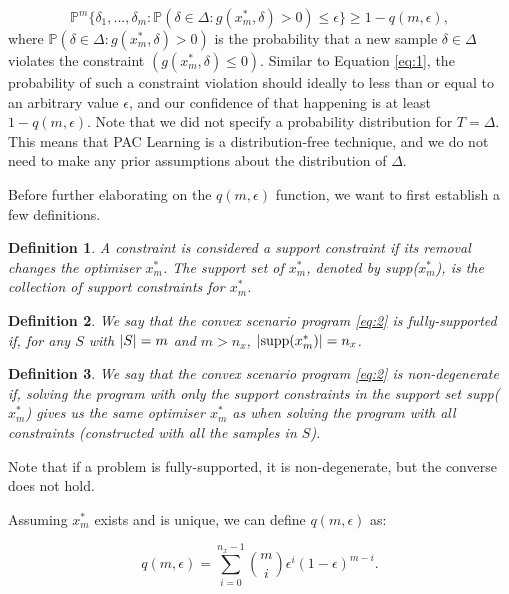 \documentclass[11pt]{article}
\newtheorem{theorem}{Definition}
\begin{document}
\begin{equation}
	\label{eq:3}
	\mathbb{P}^{m} \{\delta_{1},...,\delta_{m}: \mathbb{P}(\delta \in \Delta: g(x^{*}_{m},\delta) > 0) \leq \epsilon \} \geq 1 - q(m,\epsilon),
\end{equation}
where $\mathbb{P}(\delta \in \Delta: g(x^{*}_{m},\delta) > 0)$ is the probability that a new sample $\delta\in \Delta$ violates the constraint $(g(x^{*}_{m},\delta) \leq 0)$. Similar to Equation \ref{eq:1}, the probability of such a constraint violation should ideally to less than or equal to an arbitrary value $\epsilon$, and our confidence of that happening is at least $1 - q(m,\epsilon)$. Note that we did not specify a probability distribution for $T=\Delta$. This means that PAC Learning is a distribution-free technique, and we do not need to make any prior assumptions about the distribution of $\Delta$.

Before further elaborating on the $q(m,\epsilon)$ function, we want to first establish a few definitions.


\begin{theorem}
	A constraint is considered a support constraint if its removal changes the optimiser $x^{*}_{m}$. The support set of $x^{*}_{m}$, denoted by supp($x^{*}_{m}$), is the collection of support constraints for $x^{*}_{m}$.
\end{theorem}

\begin{theorem}
	We say that the convex scenario program \ref{eq:2} is fully-supported if, for any $S$ with $\abs{S} = m$ and $m > n_{x}$, $\abs{\text{supp}(x^{*}_{m})} = n_{x}$.
\end{theorem}

\begin{theorem}
	We say that the convex scenario program \ref{eq:2} is non-degenerate if, solving the program with only the support constraints in the support set supp($x^{*}_{m}$) gives us the same optimiser $x^{*}_{m}$ as when solving the program with all constraints (constructed with all the samples in $S$).
\end{theorem}

Note that if a problem is fully-supported, it is non-degenerate, but the converse does not hold.

Assuming $x^{*}_{m}$ exists and is unique, we can define $q(m,\epsilon)$ as:

\begin{equation}
	\label{eq:4}
	q(m,\epsilon) = \sum_{i=0}^{n_{x}-1}{\binom{m}{i}}\epsilon^{i}(1-\epsilon)^{m-i}.
\end{equation}
\end{document}
